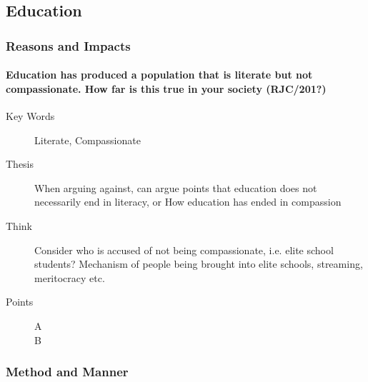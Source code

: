 \documentclass[../../main]{subfiles}
\begin{document}
\subsection{Education}

\subsubsection{Reasons and Impacts}

	\paragraph{Education has produced a population that is literate but not compassionate. How far is this true in your society (RJC/201?)}
	\begin{description}
		\item[Key Words] Literate, Compassionate
		\item[Thesis] When arguing against, can argue points that education does not necessarily end in literacy, or How education has ended in compassion
		\item[Think] Consider who is accused of not being compassionate, i.e. elite school students? Mechanism of people being brought into elite schools, streaming, meritocracy etc.
		\item[Points] \hfill
			\begin{description}
				\item[A] 
				\item[B] 
			\end{description}
	\end{description}

\subsubsection{Method and Manner}
\end{document}

